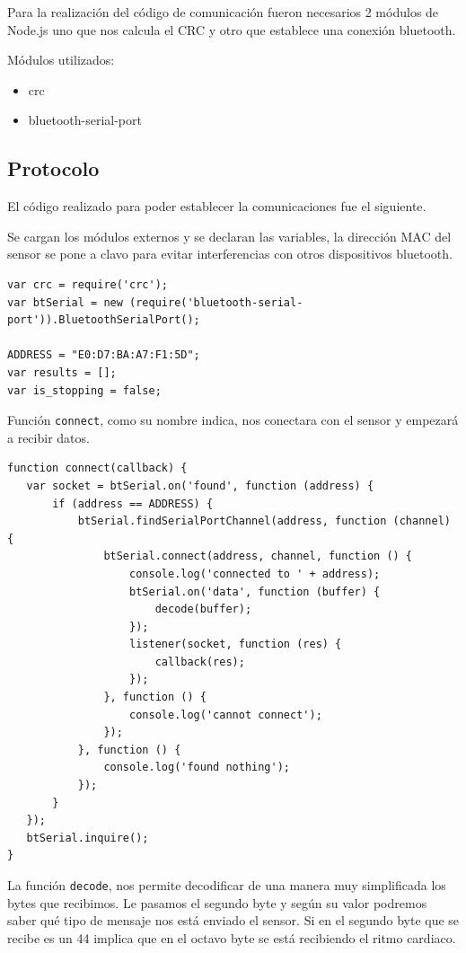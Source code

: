 Para la realización del código de comunicación fueron necesarios 2 módulos de Node.js uno que nos calcula el CRC y otro que establece una conexión bluetooth.

Módulos utilizados:

\begin{itemize}
\item crc
\item bluetooth-serial-port 
\end{itemize}
\pagebreak

\subsection{Protocolo}

El código realizado para poder establecer la comunicaciones fue el siguiente.
 
Se cargan los módulos externos y se declaran las variables, la dirección MAC del sensor se pone a clavo para evitar interferencias con otros dispositivos bluetooth.

\begin{verbatim}
var crc = require('crc');
var btSerial = new (require('bluetooth-serial-port')).BluetoothSerialPort();

ADDRESS = "E0:D7:BA:A7:F1:5D";
var results = [];
var is_stopping = false;
\end{verbatim}

Función \texttt{connect}, como su nombre indica, nos conectara con el sensor y empezará a recibir datos. 

\begin{verbatim}
function connect(callback) {
   var socket = btSerial.on('found', function (address) {
       if (address == ADDRESS) {
           btSerial.findSerialPortChannel(address, function (channel) {
               btSerial.connect(address, channel, function () {
                   console.log('connected to ' + address);
                   btSerial.on('data', function (buffer) {
                       decode(buffer);
                   });
                   listener(socket, function (res) {
                       callback(res);
                   });
               }, function () {
                   console.log('cannot connect');
               });
           }, function () {
               console.log('found nothing');
           });
       }
   });
   btSerial.inquire();
}
\end{verbatim}

La función \texttt{decode}, nos permite decodificar de una manera muy simplificada los bytes que recibimos. Le pasamos el segundo byte y según su valor podremos saber qué tipo de mensaje nos está enviado el sensor. Si en el segundo byte que se recibe es un 44 implica que en el octavo byte se está recibiendo el ritmo cardiaco.

